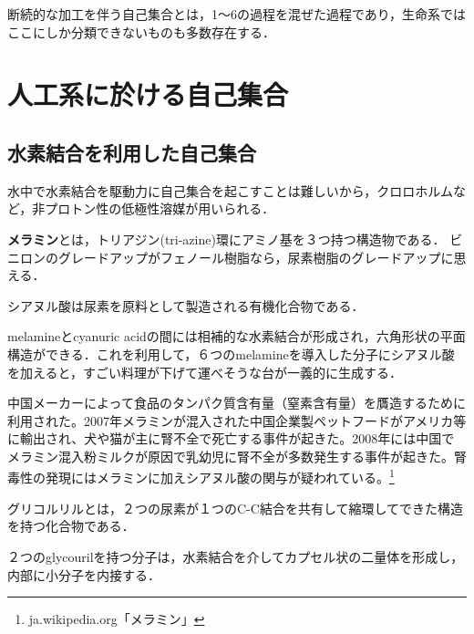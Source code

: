 \documentclass[uplatex, dvipdfmx]{jsreport}
\begin{document}
\begin{definition}
    断続的な加工を伴う自己集合とは，1〜6の過程を混ぜた過程であり，生命系ではここにしか分類できないものも多数存在する．
\end{definition}

\section{人工系に於ける自己集合}

\subsection{水素結合を利用した自己集合}
水中で水素結合を駆動力に自己集合を起こすことは難しいから，クロロホルムなど，非プロトン性の低極性溶媒が用いられる．

\begin{definition}[melamine]
    \textbf{メラミン}とは，トリアジン(tri-azine)環にアミノ基を３つ持つ構造物である．
    ビニロンのグレードアップがフェノール樹脂なら，尿素樹脂のグレードアップに思える．
\end{definition}
\begin{definition}
    シアヌル酸は尿素を原料として製造される有機化合物である．
\end{definition}
\begin{example}[メラミンとシアヌル酸]
    melamineとcyanuric acidの間には相補的な水素結合が形成され，六角形状の平面構造ができる．これを利用して，６つのmelamineを導入した分子にシアヌル酸を加えると，すごい料理が下げて運べそうな台が一義的に生成する．
\end{example}
\begin{example}[メラミン混入事件]
    中国メーカーによって食品のタンパク質含有量（窒素含有量）を贋造するために利用された。2007年メラミンが混入された中国企業製ペットフードがアメリカ等に輸出され、犬や猫が主に腎不全で死亡する事件が起きた。2008年には中国でメラミン混入粉ミルクが原因で乳幼児に腎不全が多数発生する事件が起きた。腎毒性の発現にはメラミンに加えシアヌル酸の関与が疑われている。\footnote{ja.wikipedia.org「メラミン」}
\end{example}

\begin{definition}[glycoluril]\label{def-glycoluril}
    グリコルリルとは，２つの尿素が１つのC-C結合を共有して縮環してできた構造を持つ化合物である．
\end{definition}
\begin{example}
    ２つのglycourilを持つ分子は，水素結合を介してカプセル状の二量体を形成し，内部に小分子を内接する．
\end{example}
\end{document}
